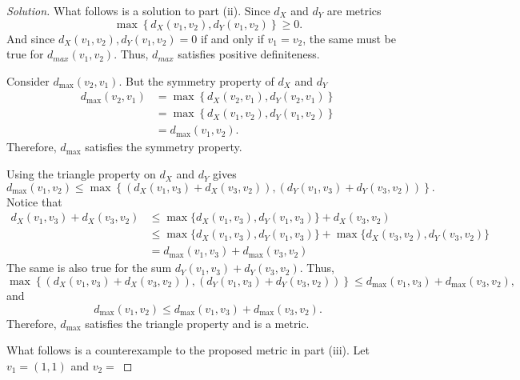 \documentclass[11pt,letterpaper]{article}
\newcommand{\R}{\mathbb{R}}
\newenvironment{prob}[1]
  {\renewcommand\theinnerprob{#1}\innerprob}
  {\endinnerprob}
\newenvironment{solution}
  {\renewcommand\qedsymbol{}\begin{proof}[Solution]}
  {\end{proof}\bigskip}
\begin{document}
\begin{solution}
	What follows is a solution to part (ii). Since $d_X$ and $d_Y$ are metrics $$\max\left\{ d_X(v_1,v_2), d_Y(v_1,v_2)\right\} \geq 0.$$ And since $d_X(v_1,v_2), d_Y(v_1,v_2) = 0$ if and only if $v_1 = v_2$, the same must be true for $d_{max}(v_1,v_2)$. Thus, $d_{max}$ satisfies positive definiteness.
	
	Consider $d_{\max}(v_2,v_1)$. But the symmetry property of $d_X$ and $d_Y$
	\[\begin{split}
		d_{\max}(v_2,v_1) &= \max\left\{ d_X(v_2,v_1), d_Y(v_2,v_1)\right\}\\
		&=\max\left\{ d_X(v_1,v_2), d_Y(v_1,v_2)\right\}\\
		&= d_{\max}(v_1,v_2).
	\end{split}\] Therefore, $d_{\max}$ satisfies the symmetry property.
	
	Using the triangle property on $d_X$ and $d_Y$ gives $$d_{\max}(v_1,v_2) \leq \max\left\{\left ( d_X(v_1,v_3) + d_X(v_3,v_2) \right ), \left ( d_Y(v_1,v_3) + d_Y(v_3,v_2)\right ) \right \}.$$ Notice that 
	\[\begin{split}
		d_X(v_1,v_3) + d_X(v_3,v_2) &\leq \max\{d_X(v_1,v_3), d_Y(v_1,v_3)\} + d_X(v_3,v_2)\\
		&\leq \max\{d_X(v_1,v_3), d_Y(v_1,v_3)\} + \max\{d_X(v_3,v_2), d_Y(v_3,v_2)\}\\
		&= d_{\max}(v_1,v_3) + d_{\max}(v_3,v_2)
	\end{split}\] The same is also true for the sum $d_Y(v_1,v_3) + d_Y(v_3,v_2)$. Thus, 
	$$ \max\left\{\left ( d_X(v_1,v_3) + d_X(v_3,v_2) \right ), \left ( d_Y(v_1,v_3) + d_Y(v_3,v_2)\right ) \right \} \leq d_{\max}(v_1,v_3) + d_{\max}(v_3,v_2),$$ and $$
	d_{\max}(v_1,v_2) \leq d_{\max}(v_1,v_3) + d_{\max}(v_3,v_2).$$ Therefore, $d_{\max}$ satisfies the triangle property and is a metric. 
	
	What follows is a counterexample to the proposed metric in part (iii). Let $v_1 = (1,1)$ and $v_2 = $
	 
\end{solution}
\newpage



%
%
\end{document}
